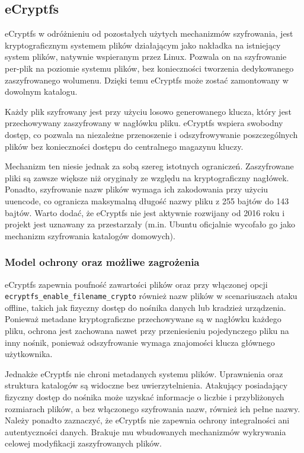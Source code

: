 \documentclass[a4paper]{article}
\begin{document}
\subsection{eCryptfs}
eCryptfs  w odróżnieniu od pozostałych użytych mechanizmów szyfrowania, jest kryptograficznym
systemem plików działającym jako nakładka na istniejący system plików, natywnie wspieranym
przez Linux. Pozwala on na szyfrowanie per-plik na poziomie systemu plików, bez konieczności
tworzenia dedykowanego zaszyfrowanego wolumenu. Dzięki temu eCryptfs może zostać zamontowany
w dowolnym katalogu.

Każdy plik szyfrowany jest przy użyciu losowo generowanego klucza, który jest przechowywany
zaszyfrowany w nagłówku pliku. eCryptfs wspiera swobodny dostęp, co pozwala na niezależne
przenoszenie i odszyfrowywanie poszczególnych plików bez konieczności dostępu do centralnego
magazynu kluczy.

Mechanizm ten niesie jednak za sobą szereg istotnych ograniczeń. Zaszyfrowane pliki są zawsze
większe niż oryginały ze względu na kryptograficzny nagłówek. Ponadto, szyfrowanie
nazw plików wymaga ich zakodowania przy użyciu uuencode, co ogranicza maksymalną długość
nazwy pliku z 255 bajtów do 143 bajtów. Warto dodać, że eCryptfs nie jest aktywnie rozwijany
od 2016 roku i projekt jest uznawany za przestarzały (m.in. Ubuntu oficjalnie wycofało go
jako mechanizm szyfrowania katalogów domowych).

\subsubsection{Model ochrony oraz możliwe zagrożenia}
eCryptfs zapewnia poufność zawartości plików oraz przy włączonej opcji
\texttt{ecryptfs\_enable\_filename\_crypto} również nazw plików w scenariuszach ataku
offline, takich jak fizyczny dostęp do nośnika danych lub kradzież urządzenia.
Ponieważ metadane kryptograficzne przechowywane są w nagłówku każdego pliku, ochrona jest
zachowana nawet przy przeniesieniu pojedynczego pliku na inny nośnik, ponieważ
odszyfrowanie wymaga znajomości klucza głównego użytkownika.

Jednakże eCryptfs nie chroni metadanych systemu plików. Uprawnienia oraz struktura katalogów
są widoczne bez uwierzytelnienia. Atakujący posiadający fizyczny dostęp do nośnika może uzyskać
informacje o liczbie i przybliżonych rozmiarach plików, a bez włączonego szyfrowania nazw,
również ich pełne nazwy. Należy ponadto zaznaczyć, że eCryptfs nie zapewnia ochrony integralności
ani autentyczności danych. Brakuje mu wbudowanych mechanizmów wykrywania celowej modyfikacji
zaszyfrowanych plików.
\end{document}
